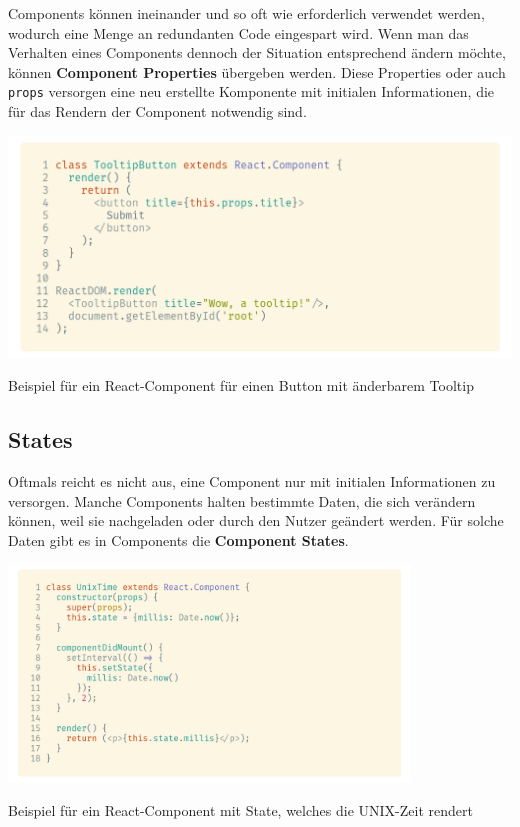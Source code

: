 Components können ineinander und so oft wie erforderlich verwendet werden, wodurch eine Menge an redundanten Code eingespart wird. Wenn man das Verhalten eines Components dennoch der Situation entsprechend ändern möchte, können \textbf{Component Properties} übergeben werden. Diese Properties oder auch \lstinline{props} versorgen eine neu erstellte Komponente mit initialen Informationen, die für das Rendern der Component notwendig sind.

\begin{code}[h]
    \centering
    \includegraphics[width=1\textwidth]{images/React/button.png}
    \vspace{-25pt}
    \caption{Beispiel für ein React-Component für einen Button mit änderbarem Tooltip}
\end{code}

\subsection{States}

Oftmals reicht es nicht aus, eine Component nur mit initialen Informationen zu versorgen. Manche Components halten bestimmte Daten, die sich verändern können, weil sie nachgeladen oder durch den Nutzer geändert werden. Für solche Daten gibt es in Components die \textbf{Component States}.

\begin{code}[h]
    \centering
    \includegraphics[width=0.8\textwidth]{images/React/unixtime.png}
    \vspace{-12pt}
    \caption{Beispiel für ein React-Component mit State, welches die UNIX-Zeit rendert}
\end{code}